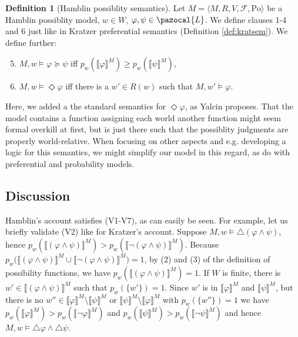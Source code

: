 \documentclass{article}
\theoremstyle{definition}
\newtheorem{definition}{Definition}
\renewcommand{\L}{\pazocal{L}}
\newcommand{\lb}{\llbracket}
\newcommand{\rb}{\rrbracket}
\newcommand{\Po}{\text{Po}}
\begin{document}
\begin{definition}[Hamblin possiblity semantics]
    \label{def:hambsem}
    Let $M = \langle M,R,V,\mathcal{F},\Po \rangle$ be a Hamblin possiblity model, $w \in W$, $\varphi, \psi \in \L$. We define clauses 1-4 and 6 just like in Kratzer preferential semantics (Definition \ref{def:kratsem}). We define further:
    \begin{enumerate}[nosep]
  \setcounter{enumi}{4}
      \item $M,w \models \varphi \succeq \psi$ iff $p_w(\lb \varphi \rb^M) \geq p_w(\lb \psi \rb^M) $,
  \setcounter{enumi}{6}
  \item $M,w \models \Diamond \varphi$ iff there is a $w' \in R(w)$ such that $ M,w' \models \varphi$.
    \end{enumerate}
\end{definition}
\noindent Here, we added a the standard semantics for $\Diamond \varphi$, as Yalcin proposes.
That the model contains a function assigning each world another function might seem formal overkill at first, but is just there such that the possiblity judgments are properly world-relative. When focusing on other aspects and e.g. developing a logic for this semantics, we might simplify our model in this regard, as \textcite{harrison-trainor17_prefer} do with preferential and probability models. 

\subsection{Discussion}

Hamblin's account satisfies (V1-V7), as can easily be seen. For example, let us briefly validate (V2) like for Kratzer's account.
Suppose $M,w \models \triangle(\varphi \land \psi)$, hence $p_w(\lb(\varphi \land \psi )\rb^M) > p_w(\lb \neg (\varphi \land \psi) \rb^M)$.
Because $p_w(\lb (\varphi \land \psi)\rb^M \cup {\lb\neg(\varphi \land \psi)\rb^M)} = 1$, by (2) and (3) of the definition of possibility functions, we have $p_w(\lb (\varphi \land \psi) \rb^M) = 1$.
If $W$ is finite, there is $w' \in \lb (\varphi \land \psi) \rb^M$ such that $p_w(\{w'\}) = 1$. Since $w'$ is in $\lb \varphi \rb^M$ and $\lb \psi \rb^M$, but there is no $w'' \in \lb \varphi \rb^M\setminus\lb \psi \rb^M$ or $\lb \psi \rb^M\setminus\lb \varphi \rb^M$ with $p_w(\{w''\}) = 1$ we have $p_w(\lb \varphi \rb^M) > p_w(\lb \neg \varphi \rb^M)$ and $p_w(\lb \psi \rb^M) > p_w(\lb \neg \psi \rb^M)$ and hence $M,w \models \triangle \varphi \land \triangle \psi$.
\end{document}
